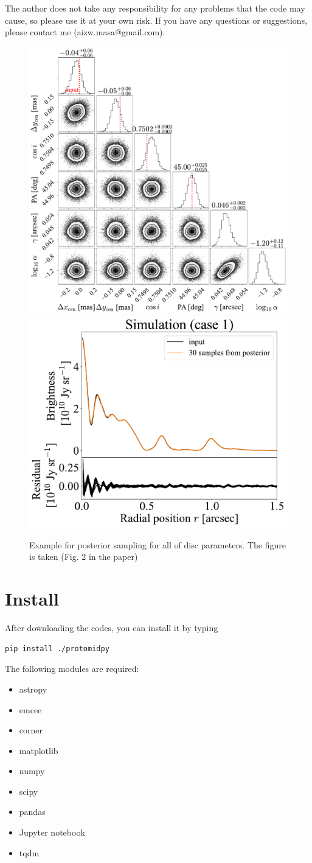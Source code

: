 \documentclass{report}
\begin{document}
The author does not take any responsibility for any problems that the code may cause, so please use it at your own risk. If you have any questions or suggestions, please contact me (aizw.masa@gmail.com).
\begin{figure}
\begin{center}
\includegraphics[width=0.48\linewidth]{./fig/recovered_sim_mcmc.pdf}
\includegraphics[width=0.48\linewidth]{./fig/posterior_sim.pdf}
\end{center}
\caption{Example for posterior sampling for all of disc parameters. The figure is taken \protect \cite{aizawa2024} (Fig. 2 in the paper)}
\label{fig:posterior_sim}
\end{figure}


\chapter{Install  \label{sec:reuired}}
After downloading the codes, you can install it by typing 
\begin{verbatim}
pip install ./protomidpy
\end{verbatim}
The following  modules are required: 
\begin{itemize}
    \item astropy
    \item emcee
    \item corner
    \item matplotlib
    \item numpy
    \item scipy
    \item pandas
    \item Jupyter notebook
    \item tqdm
\end{itemize}
\end{document}
